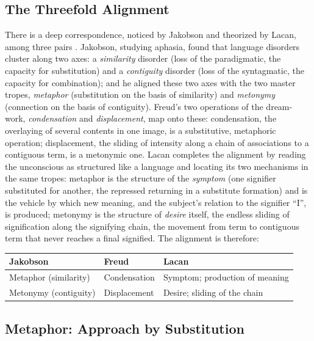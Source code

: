 \subsection{The Threefold Alignment}

There is a deep correspondence, noticed by Jakobson and theorized by Lacan, among three pairs \parencite{jakobson1956aphasia, lacan1977ecrits}. Jakobson, studying aphasia, found that language disorders cluster along two axes: a \emph{similarity} disorder (loss of the paradigmatic, the capacity for substitution) and a \emph{contiguity} disorder (loss of the syntagmatic, the capacity for combination); and he aligned these two axes with the two master tropes, \emph{metaphor} (substitution on the basis of similarity) and \emph{metonymy} (connection on the basis of contiguity). Freud's two operations of the dream-work, \emph{condensation} and \emph{displacement}, map onto these: condensation, the overlaying of several contents in one image, is a substitutive, metaphoric operation; displacement, the sliding of intensity along a chain of associations to a contiguous term, is a metonymic one. Lacan completes the alignment by reading the unconscious as structured like a language and locating its two mechanisms in the same tropes: metaphor is the structure of the \emph{symptom} (one signifier substituted for another, the repressed returning in a substitute formation) and is the vehicle by which new meaning, and the subject's relation to the signifier ``I'', is produced; metonymy is the structure of \emph{desire} itself, the endless sliding of signification along the signifying chain, the movement from term to contiguous term that never reaches a final signified. The alignment is therefore:

\smallskip
\begin{center}
\begin{tabular}{lll}
\toprule
\textbf{Jakobson} & \textbf{Freud} & \textbf{Lacan} \\
\midrule
Metaphor (similarity) & Condensation & Symptom; production of meaning \\
Metonymy (contiguity) & Displacement & Desire; sliding of the chain \\
\bottomrule
\end{tabular}
\end{center}
\smallskip

\subsection{Metaphor: Approach by Substitution}

